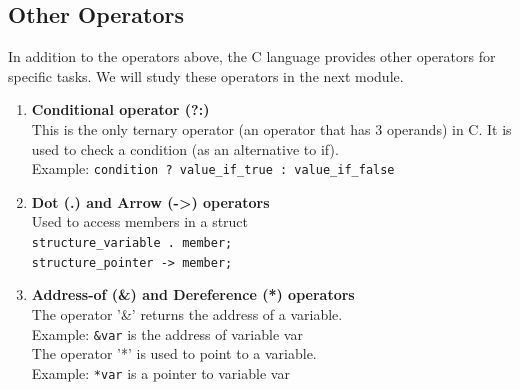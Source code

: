 \subsection{Other Operators}

In addition to the operators above, the C language provides other operators for specific tasks.  
We will study these operators in the next module.
\begin{enumerate}
    \item \textbf{Conditional operator (?:)} \\  
    This is the only ternary operator (an operator that has 3 operands) in C.  
    It is used to check a condition (as an alternative to if). \\  
    Example: \verb|condition ? value_if_true : value_if_false|
    \item \textbf{Dot (.) and Arrow (->) operators} \\  
    Used to access members in a struct \\  
    \verb|structure_variable . member;| \\  
    \verb|structure_pointer -> member;|
    \item \textbf{Address-of (\&) and Dereference (*) operators} \\  
    The operator '\&' returns the address of a variable. \\  
    Example: \verb|&var| is the address of variable var \\  
    The operator '*' is used to point to a variable. \\  
    Example: \verb|*var| is a pointer to variable var
\end{enumerate}

